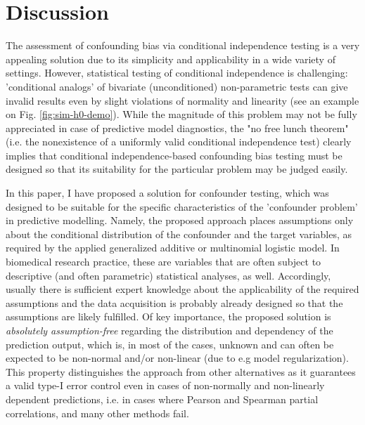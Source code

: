 \documentclass{article}
\begin{document}
\section{Discussion}

The assessment of confounding bias via conditional independence testing is a very appealing solution due to its simplicity and applicability in a wide variety of settings. However, statistical testing of conditional independence is challenging: 'conditional analogs' of bivariate (unconditioned) non-parametric tests can give invalid results even by slight violations of normality and linearity\citep{korn1984ranges} (see an example on Fig. \ref{fig:sim-h0-demo}). While the magnitude of this problem may not be fully appreciated in case of predictive model diagnostics, the "no free lunch theorem" (i.e. the nonexistence of a uniformly valid conditional independence test)\cite{shah2020hardness} clearly implies that conditional independence-based confounding bias testing must be designed so that its suitability for the particular problem may be judged easily.

In this paper, I have proposed a solution for confounder testing, which was designed to be suitable for the specific characteristics of the 'confounder problem' in predictive modelling. Namely, the proposed approach places assumptions only about the conditional distribution of the confounder and the target variables, as required by the applied generalized additive\cite{hastie1987generalized} or multinomial logistic model\cite{bennett1966multiple, jones1975proability}. In biomedical research practice, these are variables that are often subject to descriptive (and often parametric) statistical analyses, as well. Accordingly, usually there is sufficient expert knowledge about the applicability of the required assumptions and the data acquisition is probably already designed so that the assumptions are likely fulfilled.
Of key importance, the proposed solution is \emph{absolutely assumption-free} regarding the distribution and dependency of the prediction output, which is, in most of the cases, unknown and can often be expected to be non-normal and/or non-linear (due to e.g model regularization)\citep{garcia2009study, kristensen2017whole}. 
This property distinguishes the approach from other alternatives as it guarantees a valid type-I error control even in cases of non-normally and non-linearly dependent predictions, i.e. in cases where Pearson and Spearman partial correlations, and many other methods fail.
\end{document}
